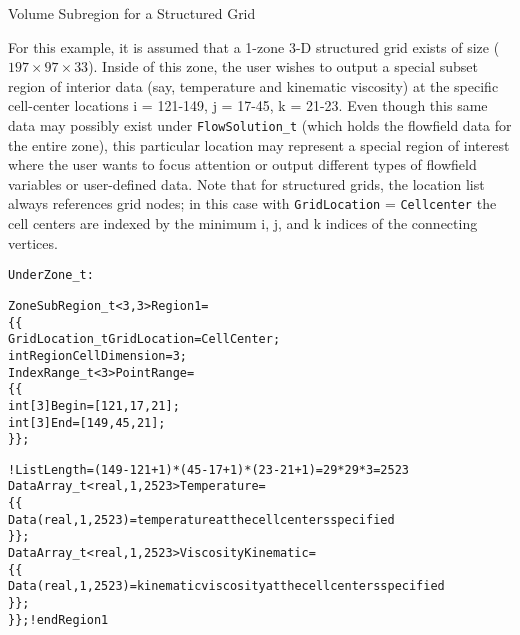 \begin{example}{Volume Subregion for a Structured Grid}
\label{ex:zonesubregion1}

For this example, it is assumed that a 1-zone 3-D structured grid exists
of size ($197 \times 97 \times 33$). Inside of this zone, the user wishes to output a
special subset region of interior data (say, temperature and kinematic viscosity)
at the specific cell-center locations i = 121-149, j = 17-45, k = 21-23.
Even though this same data may possibly exist under \texttt{FlowSolution\_t}
(which holds the flowfield data for the entire zone), this particular location
may represent a special region of interest where the user wants to focus attention
or output different types of flowfield variables or user-defined data.
Note that for structured grids, the location list always references grid nodes;
in this case with \texttt{GridLocation} = \texttt{Cellcenter} the cell centers
are indexed by the minimum i, j, and k indices of the connecting vertices.

\begin{alltt}
Under Zone\_t:

  ZoneSubRegion\_t<3,3> Region1 =
    \{\{
    GridLocation\_t GridLocation = CellCenter ;
    int RegionCellDimension = 3;
    IndexRange\_t<3> PointRange =
      \{\{
      int[3] Begin = [121,17,21];
      int[3] End = [149,45,21];
      \}\};

    ! ListLength = (149-121+1)*(45-17+1)*(23-21+1) = 29*29*3 = 2523
    DataArray\_t<real,1,2523> Temperature =
      \{\{
      Data(real,1,2523) = temperature at the cell centers specified
      \}\} ;
    DataArray\_t<real,1,2523> ViscosityKinematic =
      \{\{
      Data(real,1,2523) = kinematic viscosity at the cell centers specified
      \}\} ;
    \}\} ; ! end Region1
\end{alltt}

\end{example}

